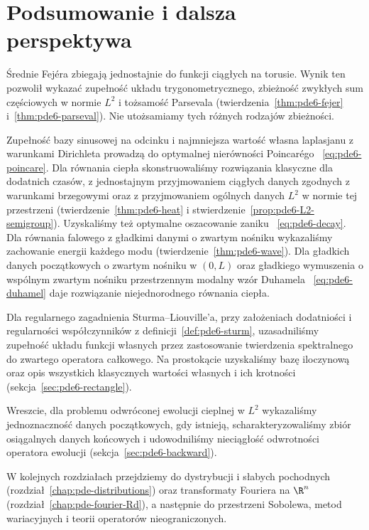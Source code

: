 \section{Podsumowanie i dalsza perspektywa}
\label{sec:pde6-summary}

Średnie Fejéra zbiegają jednostajnie do funkcji
ciągłych na torusie. Wynik ten pozwolił wykazać
zupełność układu trygonometrycznego, zbieżność zwykłych
sum częściowych w normie $L^2$ i tożsamość Parsevala
(twierdzenia~\ref{thm:pde6-fejer} i~\ref{thm:pde6-parseval}).
Nie utożsamiamy tych różnych rodzajów zbieżności.

Zupełność bazy sinusowej na odcinku i najmniejsza
wartość własna laplasjanu z warunkami Dirichleta
prowadzą do optymalnej nierówności Poincarégo
~\eqref{eq:pde6-poincare}.
Dla równania ciepła skonstruowaliśmy rozwiązania
klasyczne dla dodatnich czasów, z jednostajnym
przyjmowaniem ciągłych danych zgodnych z warunkami
brzegowymi oraz z przyjmowaniem ogólnych danych
$L^2$ w normie tej przestrzeni
(twierdzenie~\ref{thm:pde6-heat} i
stwierdzenie~\ref{prop:pde6-L2-semigroup}).
Uzyskaliśmy też optymalne oszacowanie zaniku
~\eqref{eq:pde6-decay}. Dla równania falowego
z gładkimi danymi o zwartym nośniku wykazaliśmy
zachowanie energii każdego modu
(twierdzenie~\ref{thm:pde6-wave}).
Dla gładkich danych początkowych o zwartym nośniku
w $(0,L)$ oraz gładkiego wymuszenia o wspólnym
zwartym nośniku przestrzennym modalny wzór Duhamela
~\eqref{eq:pde6-duhamel} daje rozwiązanie
niejednorodnego równania ciepła.

Dla regularnego zagadnienia Sturma--Liouville'a,
przy założeniach dodatniości i regularności
współczynników z definicji~\ref{def:pde6-sturm},
uzasadniliśmy zupełność układu funkcji własnych
przez zastosowanie twierdzenia spektralnego
do zwartego operatora całkowego. Na prostokącie
uzyskaliśmy bazę iloczynową oraz opis wszystkich
klasycznych wartości własnych i ich krotności
(sekcja~\ref{sec:pde6-rectangle}).

Wreszcie, dla problemu odwróconej ewolucji cieplnej
w $L^2$ wykazaliśmy jednoznaczność danych początkowych,
gdy istnieją, scharakteryzowaliśmy zbiór osiągalnych
danych końcowych i udowodniliśmy nieciągłość
odwrotności operatora ewolucji
(sekcja~\ref{sec:pde6-backward}).

W kolejnych rozdziałach przejdziemy do dystrybucji
i słabych pochodnych (rozdział~\ref{chap:pde-distributions})
oraz transformaty Fouriera na $\R^n$
(rozdział~\ref{chap:pde-fourier-Rd}), a następnie
do przestrzeni Sobolewa, metod wariacyjnych
i teorii operatorów nieograniczonych.

